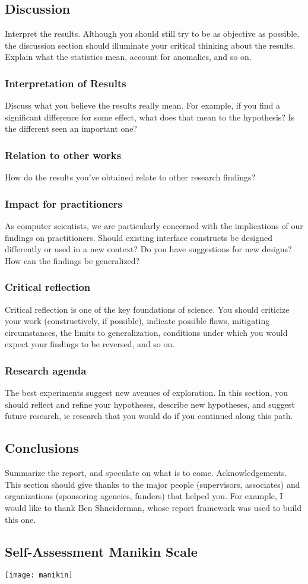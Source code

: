 \section{Discussion}
Interpret the results. Although you should still try to be as objective as possible, the discussion section should illuminate your critical thinking about the results. Explain what the statistics mean, account for anomalies, and so on.
\subsection{Interpretation of Results}
Discuss what you believe the results really mean. For example, if you find a significant difference for some effect, what does that mean to the hypothesis? Is the different seen an important one?
\subsection{Relation to other works}
How do the results you’ve obtained relate to other research findings?
\subsection{Impact for practitioners}
As computer scientists, we are particularly concerned with the implications of our findings on practitioners. Should existing interface constructs be designed differently or used in a new context? Do you have suggestions for new designs? How can the findings be generalized?
\subsection{Critical reflection}
Critical reflection is one of the key foundations of science. You should criticize your work (constructively, if possible), indicate possible flaws, mitigating circumstances, the limits to generalization, conditions under which you would expect your findings to be reversed, and so on.
\subsection{Research agenda}
The best experiments suggest new avenues of exploration. In this section, you should reflect and refine your hypotheses, describe new hypotheses, and suggest future research, ie research that you would do if you continued along this path.
\section{Conclusions}
Summarize the report, and speculate on what is to come.
Acknowledgements. This section should give thanks to the major people (supervisors, associates) and organizations (sponsoring agencies, funders) that helped you. For example, I would like to thank Ben Shneiderman, whose report framework was used to build this one.

\begin{appendices}
  \chapter{Self-Assessment Manikin Scale}
  \centering
  \texttt{[image: manikin]}
  \label{appendix:sam}
\end{appendices}